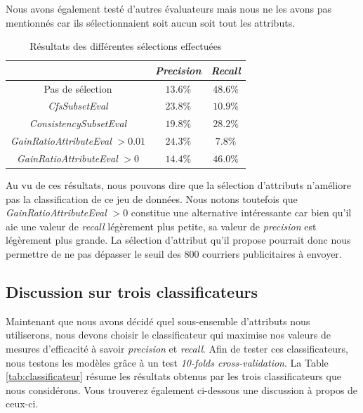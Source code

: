 \documentclass[11pt,a4paper]{article}
\begin{document}
				Nous avons également testé d'autres évaluateurs mais nous ne les avons pas mentionnés car ils sélectionnaient soit aucun soit tout les attributs.
				
				\begin{table}[h]
					\centering
					\caption{Résultats des différentes sélections effectuées}
					\label{tab:select}
					\begin{tabular}{|c|c|c|}
						\hline
						& \textit{Precision} & \textit{Recall}\\
						\hline
						Pas de sélection & $13.6\%$& $48.6\%$\\
						\hline
						\textit{CfsSubsetEval} & $23.8\%$ & $10.9\%$ \\
						\hline
						\textit{ConsistencySubsetEval} & $19.8\%$ & $28.2\%$\\
						\hline
						\textit{GainRatioAttributeEval} $>0.01$ & $24.3\%$ & $7.8\%$ \\
						\hline
						\textit{GainRatioAttributeEval} $>0$ & $14.4\%$ & $46.0\%$ \\
						\hline
					\end{tabular}
				\end{table}
				
				Au vu de ces résultats, nous pouvons dire que la sélection d'attributs n'améliore pas la classification de ce jeu de données. Nous notons toutefois que \textit{GainRatioAttributeEval} $>0$ constitue une alternative intéressante car bien qu'il aie une valeur de \textit{recall} légèrement plus petite, sa valeur de \textit{precision} est légèrement plus grande. La sélection d'attribut qu'il propose pourrait donc nous permettre de ne pas dépasser le seuil des 800 courriers publicitaires à envoyer.
				
			\subsection{Discussion sur trois classificateurs}
			
				Maintenant que nous avons décidé quel sous-ensemble d'attributs nous utiliserons, nous devons choisir le classificateur qui maximise nos valeurs de mesures d'efficacité à savoir \textit{precision} et \textit{recall}. Afin de tester ces classificateurs, nous testons les modèles grâce à un test \textit{10-folds cross-validation}. La Table \ref{tab:classificateur} résume les résultats obtenus par les trois classificateurs que nous considérons. Vous trouverez également ci-dessous une discussion à propos de ceux-ci.
				
\end{document}
